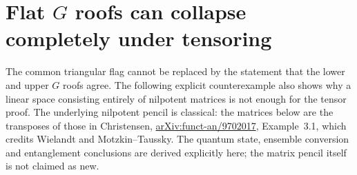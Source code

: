 \section{Flat \texorpdfstring{$G$}{G} roofs can collapse completely under tensoring}
\label{sec:flat-roof-counterexample}

The common triangular flag cannot be replaced by the statement that
the lower and upper $G$ roofs agree. The following explicit counterexample
also shows why a linear space consisting entirely of nilpotent matrices
is not enough for the tensor proof.
The underlying nilpotent pencil is classical: the matrices below are the
transposes of those in Christensen,
\href{https://arxiv.org/abs/funct-an/9702017}{arXiv:funct-an/9702017},
Example~3.1, which credits Wielandt and Motzkin--Taussky.
The quantum state, ensemble conversion and entanglement conclusions are
derived explicitly here; the matrix pencil itself is not claimed as new.

